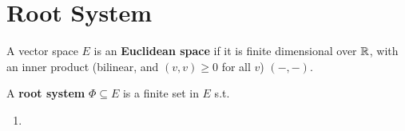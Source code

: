 \documentclass{article}
\begin{document}

\tableofcontents  
\clearpage

\section{Root System}

\begin{definition}
    A vector space $E$ is an \textbf{Euclidean space} if it is finite dimensional over $\mathbb{R}$, with an inner product (bilinear, and $(v, v) \geq 0$ for all $v$) $(-, -)$.
\end{definition}

\begin{definition}
    A \textbf{root system} $\Phi \subseteq E$ is a finite set in $E$ s.t.
    \begin{enumerate}
        \item 
    \end{enumerate}
\end{definition}
\end{document}
